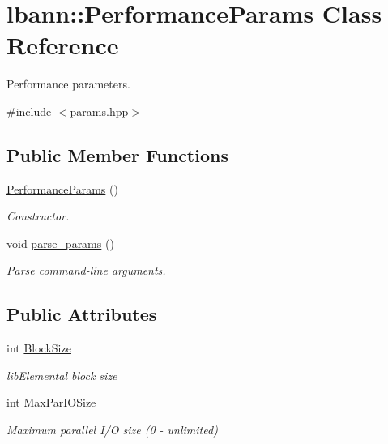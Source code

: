 \hypertarget{classlbann_1_1PerformanceParams}{}\section{lbann\+:\+:Performance\+Params Class Reference}
\label{classlbann_1_1PerformanceParams}


Performance parameters.  




{\ttfamily \#include $<$params.\+hpp$>$}

\subsection*{Public Member Functions}
\begin{DoxyCompactItemize}
\item 
\hyperlink{classlbann_1_1PerformanceParams_a1c8f2276e83effdf28e6be3ac0da91c0}{Performance\+Params} ()
\begin{DoxyCompactList}\small\item\em Constructor. \end{DoxyCompactList}\item 
void \hyperlink{classlbann_1_1PerformanceParams_abde9f8ab7421f863f11542721c93768f}{parse\+\_\+params} ()
\begin{DoxyCompactList}\small\item\em Parse command-\/line arguments. \end{DoxyCompactList}\end{DoxyCompactItemize}
\subsection*{Public Attributes}
\begin{DoxyCompactItemize}
\item 
int \hyperlink{classlbann_1_1PerformanceParams_af982cb94a2e7f01f45ff9ca80e9f8685}{Block\+Size}
\begin{DoxyCompactList}\small\item\em lib\+Elemental block size \end{DoxyCompactList}\item 
int \hyperlink{classlbann_1_1PerformanceParams_a6869434b1b4ff69d91f2998f9d194a8f}{Max\+Par\+I\+O\+Size}
\begin{DoxyCompactList}\small\item\em Maximum parallel I/O size (0 -\/ unlimited) \end{DoxyCompactList}\end{DoxyCompactItemize}


